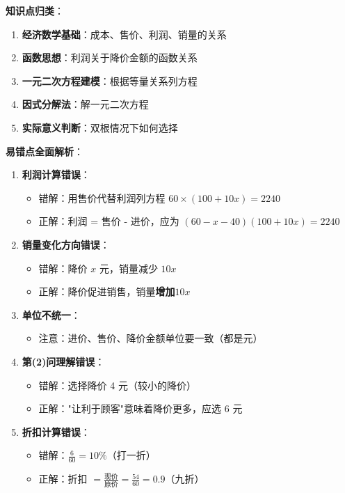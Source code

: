 \documentclass[UTF8]{ctexart}
\newenvironment{redenv}{\color{red}}{}
\newenvironment{conceptbox}{%
    \begin{tcolorbox}[colback=red!5, colframe=red!50!black, title=概念解析, fonttitle=\bfseries]
}{%
    \end{tcolorbox}
}
\begin{document}
\begin{redenv}
\begin{conceptbox}
\textbf{知识点归类}：
\begin{enumerate}
    \item \textbf{经济数学基础}：成本、售价、利润、销量的关系
    \item \textbf{函数思想}：利润关于降价金额的函数关系
    \item \textbf{一元二次方程建模}：根据等量关系列方程
    \item \textbf{因式分解法}：解一元二次方程
    \item \textbf{实际意义判断}：双根情况下如何选择
\end{enumerate}
\end{conceptbox}

\noindent\textbf{易错点全面解析}：
\begin{enumerate}[label=\arabic*.]
    \item \textbf{利润计算错误}：
    \begin{itemize}
        \item 错解：用售价代替利润列方程 $60 \times (100 + 10x) = 2240$
        \item 正解：利润 = 售价 - 进价，应为 $(60 - x - 40)(100 + 10x) = 2240$
    \end{itemize}
    
    \item \textbf{销量变化方向错误}：
    \begin{itemize}
        \item 错解：降价 $x$ 元，销量减少 $10x$
        \item 正解：降价促进销售，销量\textbf{增加}$10x$
    \end{itemize}
    
    \item \textbf{单位不统一}：
    \begin{itemize}
        \item 注意：进价、售价、降价金额单位要一致（都是元）
    \end{itemize}
    
    \item \textbf{第(2)问理解错误}：
    \begin{itemize}
        \item 错解：选择降价 4 元（较小的降价）
        \item 正解："让利于顾客"意味着降价更多，应选 6 元
    \end{itemize}
    
    \item \textbf{折扣计算错误}：
    \begin{itemize}
        \item 错解：$\frac{6}{60} = 10\%$（打一折）
        \item 正解：折扣 $= \frac{\text{现价}}{\text{原价}} = \frac{54}{60} = 0.9$（九折）
    \end{itemize}
\end{enumerate}
\end{redenv}
\end{document}
